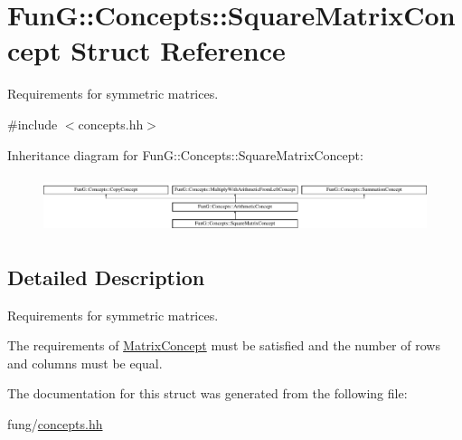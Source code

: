 \hypertarget{structFunG_1_1Concepts_1_1SquareMatrixConcept}{\section{\-Fun\-G\-:\-:\-Concepts\-:\-:\-Square\-Matrix\-Concept \-Struct \-Reference}
\label{structFunG_1_1Concepts_1_1SquareMatrixConcept}
}


\-Requirements for symmetric matrices.  




{\ttfamily \#include $<$concepts.\-hh$>$}

\-Inheritance diagram for \-Fun\-G\-:\-:\-Concepts\-:\-:\-Square\-Matrix\-Concept\-:\begin{figure}[H]
\begin{center}
\leavevmode
\includegraphics[height=1.661721cm]{structFunG_1_1Concepts_1_1SquareMatrixConcept}
\end{center}
\end{figure}


\subsection{\-Detailed \-Description}
\-Requirements for symmetric matrices. 

\-The requirements of \hyperlink{structFunG_1_1Concepts_1_1MatrixConcept}{\-Matrix\-Concept} must be satisfied and the number of rows and columns must be equal. 

\-The documentation for this struct was generated from the following file\-:\begin{DoxyCompactItemize}
\item 
fung/\hyperlink{concepts_8hh}{concepts.\-hh}\end{DoxyCompactItemize}
